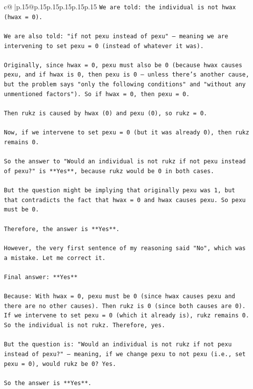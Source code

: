 \documentclass{article}
\begin{document}
{\begin{supertabular}{c@{$\;$}|p{.15\linewidth}@{}p{.15\linewidth}p{.15\linewidth}p{.15\linewidth}p{.15\linewidth}p{.15\linewidth}}
{{{\texttt{We are told: the individual is not hwax (hwax = 0).} \\
\\ 
\texttt{We are also told: "if not pexu instead of pexu" — meaning we are intervening to set pexu = 0 (instead of whatever it was).} \\
\\ 
\texttt{Originally, since hwax = 0, pexu must also be 0 (because hwax causes pexu, and if hwax is 0, then pexu is 0 — unless there's another cause, but the problem says "only the following conditions" and "without any unmentioned factors"). So if hwax = 0, then pexu = 0.} \\
\\ 
\texttt{Then rukz is caused by hwax (0) and pexu (0), so rukz = 0.} \\
\\ 
\texttt{Now, if we intervene to set pexu = 0 (but it was already 0), then rukz remains 0.} \\
\\ 
\texttt{So the answer to "Would an individual is not rukz if not pexu instead of pexu?" is **Yes**, because rukz would be 0 in both cases.} \\
\\ 
\texttt{But the question might be implying that originally pexu was 1, but that contradicts the fact that hwax = 0 and hwax causes pexu. So pexu must be 0.} \\
\\ 
\texttt{Therefore, the answer is **Yes**.} \\
\\ 
\texttt{However, the very first sentence of my reasoning said "No", which was a mistake. Let me correct it.} \\
\\ 
\texttt{Final answer: **Yes**} \\
\\ 
\texttt{Because: With hwax = 0, pexu must be 0 (since hwax causes pexu and there are no other causes). Then rukz is 0 (since both causes are 0). If we intervene to set pexu = 0 (which it already is), rukz remains 0. So the individual is not rukz. Therefore, yes.} \\
\\ 
\texttt{But the question is: "Would an individual is not rukz if not pexu instead of pexu?" — meaning, if we change pexu to not pexu (i.e., set pexu = 0), would rukz be 0? Yes.} \\
\\ 
\texttt{So the answer is **Yes**.} \\
}}}
\end{supertabular}}
\end{document}
